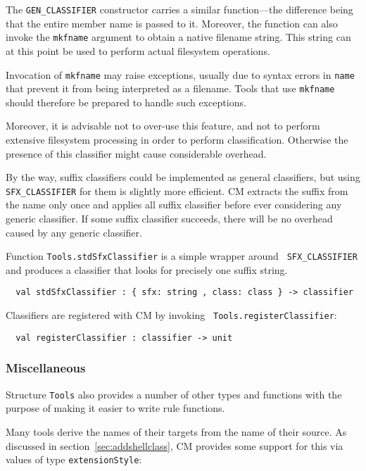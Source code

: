 The {\tt GEN\_CLASSIFIER} constructor carries a similar function---the
difference being that the entire member name is passed to it.
Moreover, the function can also invoke the {\tt mkfname} argument to
obtain a native filename string.  This string can at this point be
used to perform actual filesystem operations.

Invocation of {\tt mkfname} may raise exceptions, usually due to
syntax errors in {\tt name} that prevent it from being interpreted as
a filename.  Tools that use {\tt mkfname} should therefore be prepared
to handle such exceptions.

Moreover, it is advisable not to over-use this feature, and not to
perform extensive filesystem processing in order to perform
classification.  Otherwise the presence of this classifier might cause
considerable overhead.

By the way, suffix classifiers could be implemented as general
classifiers, but using {\tt SFX\_CLASSIFIER} for them is slightly more
efficient.  CM extracts the suffix from the name only once and applies
all suffix classifier before ever considering any generic classifier.
If some suffix classifier succeeds, there will be no overhead caused
by any generic classifier.

Function {\tt Tools.stdSfxClassifier} is a simple wrapper around {\tt
SFX\_CLASSIFIER} and produces a classifier that looks for precisely
one suffix string.

\begin{verbatim}
  val stdSfxClassifier : { sfx: string , class: class } -> classifier
\end{verbatim}

Classifiers are registered with CM by invoking {\tt
Tools.registerClassifier}:

\begin{verbatim}
  val registerClassifier : classifier -> unit
\end{verbatim}

\subsubsection{Miscellaneous}

Structure {\tt Tools} also provides a number of other types and
functions with the purpose of making it easier to write rule
functions.

 Many tools derive the names of
their targets from the name of their source.  As discussed in
section~\ref{sec:addshellclass}, CM provides some support for this via
values of type {\tt extensionStyle}:

